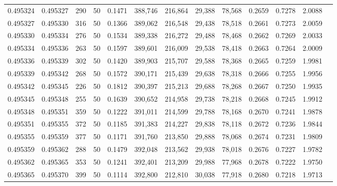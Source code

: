 \begin{tabular}{rrrrrrrrrrrrr}
0.495324 & 0.495327 &   290 &  50 &                                     0.1471 & 388,746 & 216,864 &  29,388 &  78,568 & 0.2659 & 0.7278 & 2.0088 \\
0.495327 & 0.495330 &   316 &  50 &                                     0.1366 & 389,062 & 216,548 &  29,438 &  78,518 & 0.2661 & 0.7273 & 2.0059 \\
0.495330 & 0.495334 &   276 &  50 &                                     0.1534 & 389,338 & 216,272 &  29,488 &  78,468 & 0.2662 & 0.7269 & 2.0033 \\
0.495334 & 0.495336 &   263 &  50 &                                     0.1597 & 389,601 & 216,009 &  29,538 &  78,418 & 0.2663 & 0.7264 & 2.0009 \\
0.495336 & 0.495339 &   302 &  50 &                                     0.1420 & 389,903 & 215,707 &  29,588 &  78,368 & 0.2665 & 0.7259 & 1.9981 \\
0.495339 & 0.495342 &   268 &  50 &                                     0.1572 & 390,171 & 215,439 &  29,638 &  78,318 & 0.2666 & 0.7255 & 1.9956 \\
0.495342 & 0.495345 &   226 &  50 &                                     0.1812 & 390,397 & 215,213 &  29,688 &  78,268 & 0.2667 & 0.7250 & 1.9935 \\
0.495345 & 0.495348 &   255 &  50 &                                     0.1639 & 390,652 & 214,958 &  29,738 &  78,218 & 0.2668 & 0.7245 & 1.9912 \\
0.495348 & 0.495351 &   359 &  50 &                                     0.1222 & 391,011 & 214,599 &  29,788 &  78,168 & 0.2670 & 0.7241 & 1.9878 \\
0.495351 & 0.495355 &   372 &  50 &                                     0.1185 & 391,383 & 214,227 &  29,838 &  78,118 & 0.2672 & 0.7236 & 1.9844 \\
0.495355 & 0.495359 &   377 &  50 &                                     0.1171 & 391,760 & 213,850 &  29,888 &  78,068 & 0.2674 & 0.7231 & 1.9809 \\
0.495359 & 0.495362 &   288 &  50 &                                     0.1479 & 392,048 & 213,562 &  29,938 &  78,018 & 0.2676 & 0.7227 & 1.9782 \\
0.495362 & 0.495365 &   353 &  50 &                                     0.1241 & 392,401 & 213,209 &  29,988 &  77,968 & 0.2678 & 0.7222 & 1.9750 \\
0.495365 & 0.495370 &   399 &  50 &                                     0.1114 & 392,800 & 212,810 &  30,038 &  77,918 & 0.2680 & 0.7218 & 1.9713 \\

\end{tabular}

